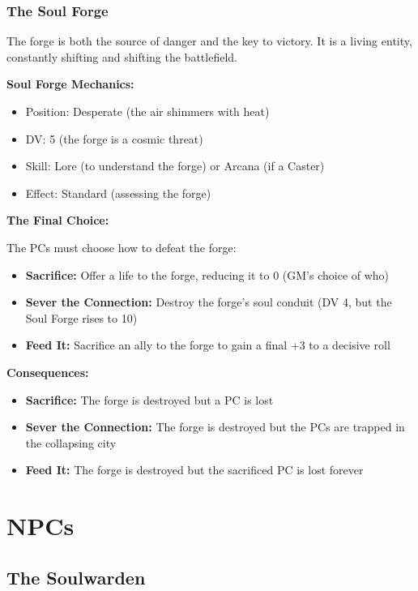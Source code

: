 \documentclass[11pt]{article}
\begin{document}
\subsubsection{The Soul Forge}

The forge is both the source of danger and the key to victory. It is a living entity, constantly shifting and shifting the battlefield.

\textbf{Soul Forge Mechanics:}
\begin{itemize}
    \item Position: Desperate (the air shimmers with heat)
    \item DV: 5 (the forge is a cosmic threat)
    \item Skill: Lore (to understand the forge) or Arcana (if a Caster)
    \item Effect: Standard (assessing the forge)
\end{itemize}

\textbf{The Final Choice:}

The PCs must choose how to defeat the forge:
\begin{itemize}
    \item \textbf{Sacrifice:} Offer a life to the forge, reducing it to 0 (GM's choice of who)
    \item \textbf{Sever the Connection:} Destroy the forge's soul conduit (DV 4, but the Soul Forge rises to 10)
    \item \textbf{Feed It:} Sacrifice an ally to the forge to gain a final +3 to a decisive roll
\end{itemize}

\textbf{Consequences:}
\begin{itemize}
    \item \textbf{Sacrifice:} The forge is destroyed but a PC is lost
    \item \textbf{Sever the Connection:} The forge is destroyed but the PCs are trapped in the collapsing city
    \item \textbf{Feed It:} The forge is destroyed but the sacrificed PC is lost forever
\end{itemize}

\section{NPCs}

\subsection{The Soulwarden}
\end{document}
